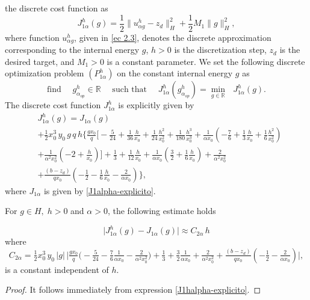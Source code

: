 \documentclass[axioms,article,submit,moreauthors]{Definitions/mdpi}
\begin{document}
       
        the discrete cost function as
\begin{equation}    
  {J^h_{1\alpha}(g)} = \frac{1}{2} \lVert {u^h_{\alpha g}} - z_d \rVert_H^2 + \frac{1}{2} M_1 \lVert g \rVert_H^2,
\end{equation}
where function ${u^h_{\alpha g}}$, given in \eqref{ec 2.3}, {denotes the discrete approximation corresponding to the internal energy $g$, $h>0$ is the discretization step, $z_d$ is the desired target, and $M_1>0$ is a constant parameter.} We set the following discrete optimization problem
 ${(P^h_{1\alpha})}$ on the constant internal energy $g$ as
\[ \text{find }\quad {g^h_{\alpha_{op}}}\in \mathbb{R}\quad\text{ such that }\quad
{J^h_{1\alpha}(g^h_{\alpha_{op}})}=\min\limits_{g\in \mathbb{R}} {\text{ }J^h_{1 \alpha }(g).}
\]
The discrete cost function  ${J^h_{1 \alpha}}$  is explicitly given by
\begin{equation}\label{J1halpha-explicito}
\begin{array}{ll}
&{J^h_{1 \alpha}} ( g)  = J_{1\alpha} ( g )\\
& +\tfrac{1}{2} x_0^3\, y_0 \,g\, q\, h \Bigg\{ \tfrac{g x_0}{q} \Big[ - \tfrac{5 }{24}+ \tfrac{1}{36}\tfrac{h}{x_0} + \tfrac{1}{24}\tfrac{h^2}{x_0^2} + \tfrac{1}{180}\tfrac{h^3}{x_0^3} +\tfrac{1}{\alpha x_0}\left( - \tfrac{7 }{6 }+\tfrac{1}{3}\tfrac{h}{x_0}+\tfrac{1}{6}\tfrac{h^2}{x_0^2}\right)\\ 
& +\tfrac{1}{\alpha^2 x_0^2}\left( -2+\tfrac{h}{x_0}\right)\Big]
+ \tfrac{1}{3}+  \tfrac{1}{12}\tfrac{h}{x_0}+\tfrac{1}{\alpha x_0}\left( \tfrac{3}{2}+\tfrac{1}{6}\tfrac{h}{x_0}\right) +\tfrac{2}{\alpha^2 x_0^2}\\
&+\tfrac{(b-z_d)}{q x_0}\left(-\tfrac{1}{2}-\tfrac{1}{6}\tfrac{h}{x_0}-\tfrac{2}{\alpha x_0} \right) \Bigg\},
\end{array}
\end{equation}
where $J_{1\alpha}$ is given by \eqref{J1alpha-explicito}.

\begin{Lemma} For $g\in H, \; h>0$ and $\alpha>0$, the following estimate holds

  \[     \lvert  {J^h_{1 \alpha}}(g) - J_{1\alpha}(g) \rvert  \approx C_{2 \alpha} \, h \]
   where \[C_{2 \alpha} = \tfrac{1}{2} x_0^3\, y_0 \,|g|\, \Bigg| \tfrac{g x_0}{q} \Big( - \tfrac{5 }{24} - \tfrac{7 }{6 }\tfrac{1}{\alpha x_0} -\tfrac{2}{\alpha^2 x_0^2}\Big)+ \tfrac{1}{3}+  \tfrac{3}{2}\tfrac{1}{\alpha x_0}+\tfrac{2}{\alpha^2 x_0^2}+\tfrac{(b-z_d)}{q x_0}\left(-\tfrac{1}{2}-\tfrac{2}{\alpha x_0} \right) \Bigg|,
\] 
   is  a constant independent of $h.$
      
    \end{Lemma}
\begin{proof}
It follows immediately from expression \eqref{J1halpha-explicito}.
\end{proof}
\end{document}

